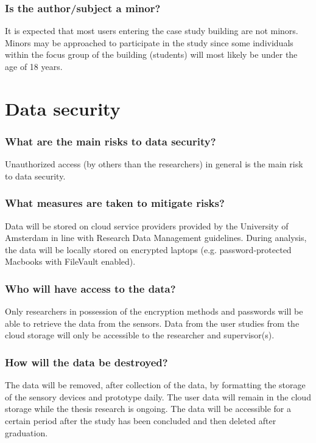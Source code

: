 \documentclass[a4paper]{article}
\begin{document}
\subsubsection{Is the author/subject a minor?}

It is expected that most users entering the case study building are not minors. Minors may be approached to participate in the study since some individuals within the focus group of the building (students) will most likely be under the age of 18 years.

\section{Data security}

\subsubsection{What are the main risks to data security?}

Unauthorized access (by others than the researchers) in general is the main risk to data security. 

\subsubsection{What measures are taken to mitigate risks?}

Data will be stored on cloud service providers provided by the University of Amsterdam in line with Research Data Management guidelines. During analysis, the data will be locally stored on encrypted laptops (e.g. password-protected Macbooks with FileVault enabled). 

\subsubsection{Who will have access to the data?}

Only researchers in possession of the encryption methods and passwords will be able to retrieve the data from the sensors. Data from the user studies from the cloud storage will only be accessible to the researcher and supervisor(s).

\subsubsection{How will the data be destroyed?}

The data will be removed, after collection of the data, by formatting the storage of the sensory devices and prototype daily. The user data will remain in the cloud storage while the thesis research is ongoing. The data will be accessible for a certain period after the study has been concluded and then deleted after graduation.
\end{document}
